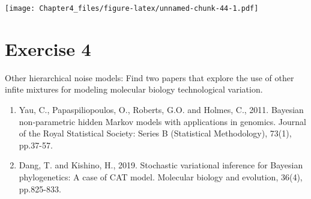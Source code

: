 \documentclass[]{article}
\begin{document}
\texttt{[image: Chapter4\_files/figure-latex/unnamed-chunk-44-1.pdf]}

\hypertarget{exercise-4}{%
\section{Exercise 4}\label{exercise-4}}

Other hierarchical noise models: Find two papers that explore the use of
other infite mixtures for modeling molecular biology technological
variation.

\begin{enumerate}
\def\labelenumi{\arabic{enumi}.}
\item
  Yau, C., Papaspiliopoulos, O., Roberts, G.O. and Holmes, C., 2011.
  Bayesian non‐parametric hidden Markov models with applications in
  genomics. Journal of the Royal Statistical Society: Series B
  (Statistical Methodology), 73(1), pp.37-57.
\item
  Dang, T. and Kishino, H., 2019. Stochastic variational inference for
  Bayesian phylogenetics: A case of CAT model. Molecular biology and
  evolution, 36(4), pp.825-833.
\end{enumerate}
\end{document}
